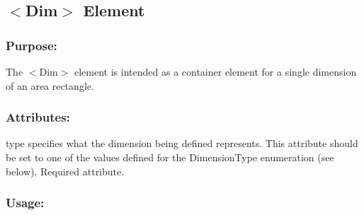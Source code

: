 \hypertarget{fal_element_ref_fal_elem_ref_sec_9}{}\subsection{$<$\+Dim$>$ Element}\label{fal_element_ref_fal_elem_ref_sec_9}
\hypertarget{fal_element_ref_fal_elem_ref_sec_9_1}{}\subsubsection{Purpose\+:}\label{fal_element_ref_fal_elem_ref_sec_9_1}
The {\ttfamily $<$Dim$>$} element is intended as a container element for a single dimension of an area rectangle.\hypertarget{fal_element_ref_fal_elem_ref_sec_9_2}{}\subsubsection{Attributes\+:}\label{fal_element_ref_fal_elem_ref_sec_9_2}
\begin{DoxyItemize}
\item {\ttfamily type} specifies what the dimension being defined represents. This attribute should be set to one of the values defined for the Dimension\+Type enumeration (see below). Required attribute.\end{DoxyItemize}
\hypertarget{fal_element_ref_fal_elem_ref_sec_9_3}{}\subsubsection{Usage\+:}\label{fal_element_ref_fal_elem_ref_sec_9_3}

